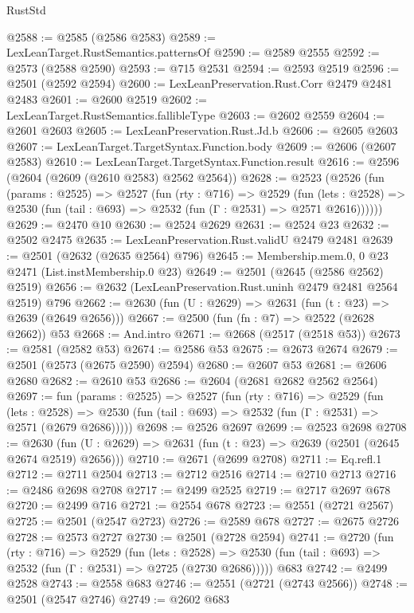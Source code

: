 \begin{lexlean}{RustStd}
\begin{coremodule}
@2588 := @2585 (@2586 @2583)
@2589 := LexLeanTarget.RustSemantics.patternsOf
@2590 := @2589 @2555
@2592 := @2573 (@2588 @2590)
@2593 := @715 @2531
@2594 := @2593 @2519
@2596 := @2501 (@2592 @2594)
@2600 := LexLeanPreservation.Rust.Corr @2479 @2481 @2483
@2601 := @2600 @2519
@2602 := LexLeanTarget.RustSemantics.fallibleType
@2603 := @2602 @2559
@2604 := @2601 @2603
@2605 := LexLeanPreservation.Rust.Jd.b
@2606 := @2605 @2603
@2607 := LexLeanTarget.TargetSyntax.Function.body
@2609 := @2606 (@2607 @2583)
@2610 := LexLeanTarget.TargetSyntax.Function.result
@2616 := @2596 (@2604 (@2609 (@2610 @2583) @2562 @2564))
@2628 := @2523
    (@2526
      (fun (params : @2525) =>
      @2527
        (fun (rty : @716) =>
        @2529
          (fun (lets : @2528) =>
          @2530 (fun (tail : @693) => @2532 (fun (Γ : @2531) => @2571 @2616))))))
@2629 := @2470 @10
@2630 := @2524 @2629
@2631 := @2524 @23
@2632 := @2502 @2475
@2635 := LexLeanPreservation.Rust.validU @2479 @2481
@2639 := @2501 (@2632 (@2635 @2564) @796)
@2645 := Membership.mem.{0, 0} @23 @2471 (List.instMembership.{0} @23)
@2649 := @2501 (@2645 (@2586 @2562) @2519)
@2656 := @2632 (LexLeanPreservation.Rust.uninh @2479 @2481 @2564 @2519) @796
@2662 := @2630 (fun (U : @2629) => @2631 (fun (t : @23) => @2639 (@2649 @2656)))
@2667 := @2500 (fun (fn : @7) => @2522 (@2628 @2662)) @53
@2668 := And.intro
@2671 := @2668 (@2517 (@2518 @53))
@2673 := @2581 (@2582 @53)
@2674 := @2586 @53
@2675 := @2673 @2674
@2679 := @2501 (@2573 (@2675 @2590) @2594)
@2680 := @2607 @53
@2681 := @2606 @2680
@2682 := @2610 @53
@2686 := @2604 (@2681 @2682 @2562 @2564)
@2697 := fun (params : @2525) =>
  @2527
    (fun (rty : @716) =>
    @2529
      (fun (lets : @2528) =>
      @2530 (fun (tail : @693) => @2532 (fun (Γ : @2531) => @2571 (@2679 @2686)))))
@2698 := @2526 @2697
@2699 := @2523 @2698
@2708 := @2630 (fun (U : @2629) => @2631 (fun (t : @23) => @2639 (@2501 (@2645 @2674 @2519) @2656)))
@2710 := @2671 (@2699 @2708)
@2711 := Eq.refl.{1}
@2712 := @2711 @2504
@2713 := @2712 @2516
@2714 := @2710 @2713
@2716 := @2486 @2698 @2708
@2717 := @2499 @2525
@2719 := @2717 @2697 @678
@2720 := @2499 @716
@2721 := @2554 @678
@2723 := @2551 (@2721 @2567)
@2725 := @2501 (@2547 @2723)
@2726 := @2589 @678
@2727 := @2675 @2726
@2728 := @2573 @2727
@2730 := @2501 (@2728 @2594)
@2741 := @2720
    (fun (rty : @716) =>
    @2529
      (fun (lets : @2528) =>
      @2530 (fun (tail : @693) => @2532 (fun (Γ : @2531) => @2725 (@2730 @2686)))))
    @683
@2742 := @2499 @2528
@2743 := @2558 @683
@2746 := @2551 (@2721 (@2743 @2566))
@2748 := @2501 (@2547 @2746)
@2749 := @2602 @683

\end{coremodule}
\end{lexlean}
